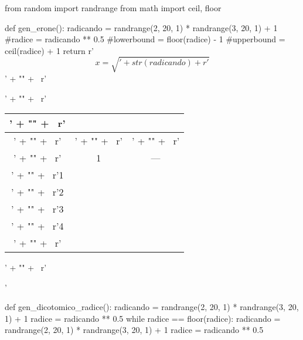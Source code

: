 \documentclass[10pt,a4paper,addpoints%
]{exam}
\begin{document}
\begin{pycode}
from random import randrange
from math import ceil, floor

def gen_erone():
  radicando = randrange(2, 20, 1) * randrange(3, 20, 1) + 1
  #radice = radicando ** 0.5
  #lowerbound = floor(radice) - 1
  #upperbound = ceil(radice) + 1
  return r'$$x = \sqrt{' + str(radicando) + r'}$$' + "\n" + \
        r'\begin{center}' + "\n" + \
        r'\begin{tabular}{|c|p{3.5cm}|p{3.5cm}|}\hline' + "\n" + \
        r'\multicolumn{3}{|c|}{\bf Iterazioni del metodo di Erone}\\\hline' + "\n" + \
        r'\multicolumn{1}{|c|}{$k$}&' + "\n" + \
        r'\multicolumn{1}{|c|}{$\displaystyle \frac{x_k + \frac{' + \
        str(radicando) + \
        r'}{x_k}}{2}$}&' + "\n" + \
        r'\multicolumn{1}{|c|}{$|x_{k} - x_{k-1}|$}\\\hline' + "\n" + \
        r'\multicolumn{1}{|c|}{0}&\multicolumn{1}{|c|}{1}&\multicolumn{1}{|c|}{---}\\\hline' + "\n" + \
        r'1&&\\\hline' + "\n" + \
        r'2&&\\\hline' + "\n" + \
        r'3&&\\\hline' + "\n" + \
        r'4&&\\\hline' + "\n" + \
        r'\end{tabular}' + "\n" + \
        r'\end{center}'

def gen_dicotomico_radice():
  radicando = randrange(2, 20, 1) * randrange(3, 20, 1) + 1
  radice = radicando ** 0.5
  while radice == floor(radice):
    radicando = randrange(2, 20, 1) * randrange(3, 20, 1) + 1
    radice = radicando ** 0.5
  

\end{pycode}
\end{document}
